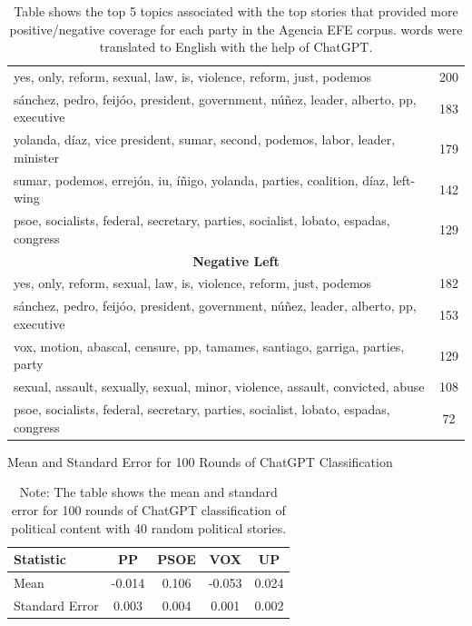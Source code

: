 \documentclass[12pt]{article}
\begin{document}
\begin{table}[!htb]
\begin{tabular}{|l|c|}
		\hline
		yes, only, reform, sexual, law, is, violence, reform, just, podemos & 200 \\
		sánchez, pedro, feijóo, president, government, núñez, leader, alberto, pp, executive & 183 \\
		yolanda, díaz, vice president, sumar, second, podemos, labor, leader, minister & 179 \\
		sumar, podemos, errejón, iu, íñigo, yolanda, parties, coalition, díaz, left-wing & 142 \\
		psoe, socialists, federal, secretary, parties, socialist, lobato, espadas, congress & 129 \\
		\hline
		\multicolumn{2}{|c|}{\textbf{Negative Left}} \\
		\hline
		yes, only, reform, sexual, law, is, violence, reform, just, podemos & 182 \\
		sánchez, pedro, feijóo, president, government, núñez, leader, alberto, pp, executive & 153 \\
		vox, motion, abascal, censure, pp, tamames, santiago, garriga, parties, party & 129 \\
		sexual, assault, sexually, sexual, minor, violence, assault, convicted, abuse & 108 \\
		psoe, socialists, federal, secretary, parties, socialist, lobato, espadas, congress & 72 \\
		\hline
	\end{tabular}
	\caption{Table shows the top 5 topics associated with the top stories that provided more positive/negative coverage for each party in the Agencia EFE corpus. words were translated to English with the help of ChatGPT. }
\end{table}

	
	
	
	\begin{table}[!htb]
		\centering
		\caption{Mean and Standard Error for 100 Rounds of ChatGPT Classification}
		\begin{tabular}{|l|c|c|c|c|}
			\hline
			\textbf{Statistic} & \textbf{PP} & \textbf{PSOE} & \textbf{VOX} & \textbf{UP} \\
			\hline
			Mean & -0.014 & 0.106 & -0.053 & 0.024 \\
			Standard Error & 0.003 & 0.004 & 0.001 & 0.002 \\
			\hline
		\end{tabular}
		\caption*{Note: The table shows the mean and standard error for 100 rounds of ChatGPT classification of political content with 40 random political stories.}
		\label{tab:table_stability}
	\end{table}
	
\end{document}
